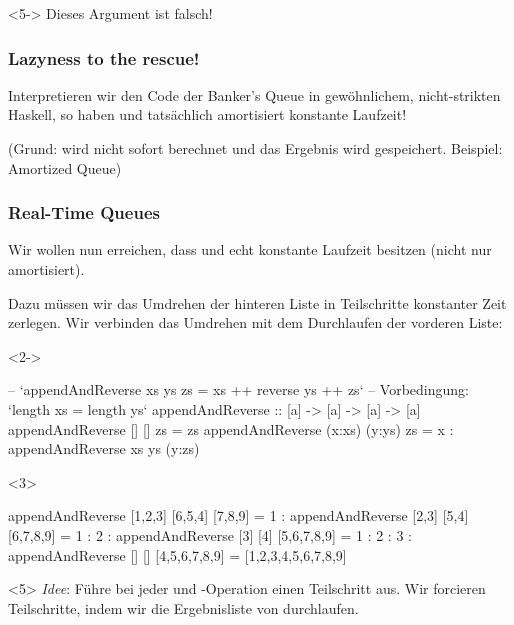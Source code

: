 \documentclass{beamer}
\begin{document}
\begin{frame}[t,fragile]
\begin{onlyenv}<5->
  \vspace{0.5cm}
  {\color{red} Dieses Argument ist falsch!}
\end{onlyenv}
\end{frame}

\begin{frame}[t,fragile]
  \frametitle{Lazyness to the rescue!}

  Interpretieren wir den Code der Banker's Queue in gewöhnlichem, nicht-strikten Haskell, so haben  und  tatsächlich amortisiert konstante Laufzeit!

  (Grund:  wird nicht sofort berechnet und das Ergebnis wird gespeichert. Beispiel: Amortized Queue)
\end{frame}

\begin{frame}[t,fragile]
  \frametitle{Real-Time Queues}
  Wir wollen nun erreichen, dass  und  echt konstante Laufzeit besitzen (nicht nur amortisiert).

  Dazu müssen wir das Umdrehen der hinteren Liste in Teilschritte konstanter Zeit zerlegen.
  Wir verbinden das Umdrehen mit dem Durchlaufen der vorderen Liste:

  \begin{onlyenv}<2->
\begin{haskellcode}
-- `appendAndReverse xs ys zs = xs ++ reverse ys ++ zs`
-- Vorbedingung: `length xs = length ys`
appendAndReverse :: [a] -> [a] -> [a] -> [a]
appendAndReverse []     []     zs = zs
appendAndReverse (x:xs) (y:ys) zs =
  x : appendAndReverse xs ys (y:zs)
\end{haskellcode}
  \end{onlyenv}

  \begin{onlyenv}<3>
\begin{haskellcode}
  appendAndReverse [1,2,3] [6,5,4] [7,8,9]
= 1 : appendAndReverse [2,3] [5,4] [6,7,8,9]
= 1 : 2 : appendAndReverse [3] [4] [5,6,7,8,9]
= 1 : 2 : 3 : appendAndReverse [] [] [4,5,6,7,8,9]
= [1,2,3,4,5,6,7,8,9]
\end{haskellcode}
  \end{onlyenv}

  \begin{onlyenv}<5>
    \textit{Idee}: Führe bei jeder  und -Operation einen Teilschritt aus.
    Wir forcieren Teilschritte, indem wir die Ergebnisliste von  durchlaufen.
  \end{onlyenv}
\end{frame}
\end{document}
